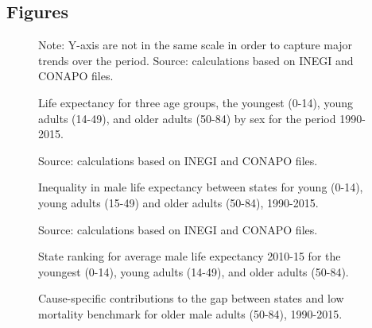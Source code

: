 \documentclass{bmcart}
\begin{document}
\begin{backmatter}



\section*{Figures}

\begin{figure}[h!]
\centering
\caption{Life expectancy for three age groups, the youngest (0-14), young adults (14-49), and older adults (50-84) by sex for the period 1990-2015.}
\label{Fig1}

Note: Y-axis are not in the same scale in order to capture major trends over the period. Source: calculations based on INEGI and CONAPO files. 
\end{figure}



\begin{figure}[h!]
\centering
\caption{Inequality in male life expectancy between states for young (0-14), young adults (15-49) and older adults (50-84), 1990-2015.}
\label{Fig2}

Source: calculations based on INEGI and CONAPO files. 
\end{figure}

\begin{figure}[h!]
\centering
\caption{State ranking for average male life expectancy 2010-15 for the youngest (0-14), young adults (14-49), and older adults (50-84).}
\label{Fig3}
Source: calculations based on INEGI and CONAPO files. 
\end{figure}



\begin{figure}[h!]
\centering
\caption{Cause-specific contributions to the gap between states and low mortality benchmark for older male adults (50-84), 1990-2015.}
\label{Fig4}


\end{figure}
\end{backmatter}
\end{document}
